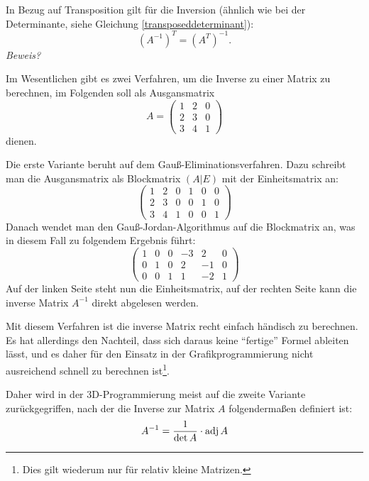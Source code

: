 In Bezug auf Transposition gilt für die Inversion (ähnlich wie bei der Determinante, siehe Gleichung \ref{transposeddeterminant}):
\begin{equation}
 (A^{-1})^T = (A^T)^{-1}.
\end{equation}
\emph{Beweis?}

Im Wesentlichen gibt es zwei Verfahren, um die Inverse zu einer Matrix zu berechnen, im Folgenden soll als Ausgansmatrix
\begin{equation*}
 A = \begin{pmatrix}
	1 & 2 & 0 \\
    2 & 3 & 0 \\
    3 & 4 & 1
 \end{pmatrix}
\end{equation*}
dienen.

Die erste Variante beruht auf dem Gauß-Eliminationsverfahren. Dazu schreibt man die Ausgansmatrix als Blockmatrix $(A|E)$ mit der Einheitsmatrix an:
\begin{equation}
 \left(\begin{array}{ccc|ccc}
    1 & 2 & 0 &  1 & 0 & 0 \\
    2 & 3 & 0 &  0 & 1 & 0 \\
    3 & 4 & 1 &  0 & 0 & 1
  \end{array}\right)
\end{equation}
Danach wendet man den Gauß-Jordan-Algorithmus auf die Blockmatrix an, was in diesem Fall zu folgendem Ergebnis führt:
\begin{equation}
  \left(\begin{array}{ccc|ccc}
    1 & 0 & 0  & -3 & 2 & 0 \\
    0 & 1 & 0  & 2 & -1 & 0 \\
    0 & 0 & 1  & 1 & -2 & 1
  \end{array}\right)
\end{equation}
Auf der linken Seite steht nun die Einheitsmatrix, auf der rechten Seite kann die inverse Matrix $A^{-1}$ direkt abgelesen werden.

Mit diesem Verfahren ist die inverse Matrix recht einfach händisch zu berechnen. Es hat allerdings den Nachteil, dass sich daraus keine \enquote{fertige} Formel ableiten lässt, und es daher für den Einsatz in der Grafikprogrammierung nicht ausreichend schnell zu berechnen ist\footnote{Dies gilt wiederum nur für relativ kleine Matrizen.}.

Daher wird in der 3D-Programmierung meist auf die zweite Variante zurückgegriffen, nach der die Inverse zur Matrix $A$ folgendermaßen definiert ist:
\begin{equation}
 A^{-1} = \frac{1}{\det A} \cdot \operatorname{adj}A
\end{equation}

